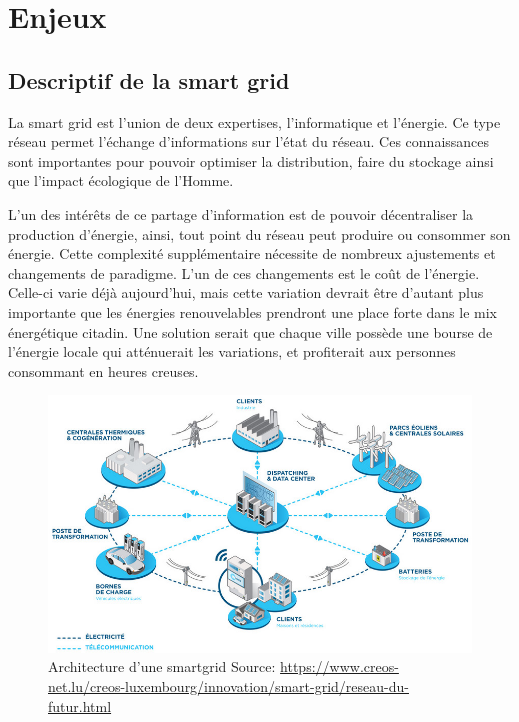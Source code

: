 \chapter{Enjeux}
\section{Descriptif de la smart grid}


La smart grid est l'union de deux expertises, l'informatique et l'énergie.
Ce type réseau permet l'échange d'informations sur l'état du réseau.
Ces connaissances sont importantes pour pouvoir optimiser la distribution, faire du stockage
ainsi que l'impact écologique de l'Homme.

L'un des intérêts de ce partage d'information est de pouvoir décentraliser la production d'énergie,
ainsi, tout point du réseau peut produire ou consommer son énergie.
Cette complexité supplémentaire nécessite de nombreux ajustements et changements de paradigme.
L'un de ces changements est le coût de l'énergie. Celle-ci varie déjà aujourd’hui, mais cette variation
devrait être d'autant plus importante que les énergies renouvelables prendront une place forte dans
le mix énergétique citadin. Une solution serait que chaque ville possède une bourse de l'énergie
locale qui atténuerait les variations, et profiterait aux personnes consommant en heures creuses.

\begin{figure}
    \centering
    \includegraphics[scale=0.25]{media/smart_city_lux.jpg}
    \caption{
        Architecture d'une smartgrid\newline
        \tiny{Source: \url{https://www.creos-net.lu/creos-luxembourg/innovation/smart-grid/reseau-du-futur.html}}
    }
\end{figure}

